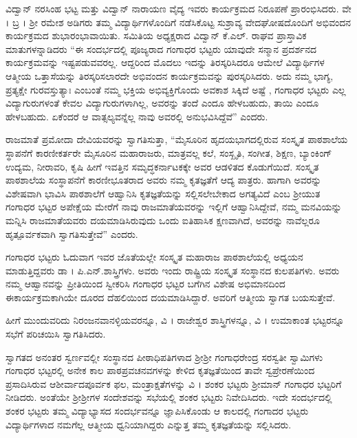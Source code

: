 {ವಿದ್ವಾನ್ ನರಸಿಂಹ ಭಟ್ಟ ಮತ್ತು ವಿದ್ವಾನ್ ನಾರಾಯಣ ವೈದ್ಯ ಇವರು ಕಾರ್ಯ\-ಕ್ರಮದ ನಿರೂಪಣೆ ಪ್ರಾರಂಭಿಸಿದರು. ವೇ । ಬ್ರ । ಶ್ರೀ ರಮೇಶ ಅಡಿಗರು ತಮ್ಮ ವಿದ್ಯಾರ್ಥಿಗಳೊಂದಿಗೆ ನಡೆಸಿಕೊಟ್ಟ ಸುಶ್ರಾವ್ಯ ವೇದಘೋಷದೊಂದಿಗೆ ಅಭಿವಂದನ ಕಾರ್ಯಕ್ರಮದ ಶುಭಾರಂಭಾವಾಯಿತು. ಸಮಿತಿಯ ಅಧ್ಯಕ್ಷರಾದ ವಿದ್ವಾನ್ ಕೆ.ಎಲ್. ರಾಘವ ಪ್ರಾಸ್ತಾವಿಕ ಮಾತುಗಳನ್ನಾಡಿದರು \enginline{-} “ಈ ಸಂದರ್ಭದಲ್ಲಿ ಪೂಜ್ಯರಾದ ಗಂಗಾಧರ ಭಟ್ಟರು ಯಾವುದೇ ಸನ್ಮಾನ ಪ್ರದರ್ಶನದ ಕಾರ್ಯಕ್ರಮವನ್ನು ಇಷ್ಟ\-ಪಡುವವರಲ್ಲ. ಆದ್ದರಿಂದ ಮೊದಲು ಇದನ್ನು ತಿರಸ್ಕರಿಸಿದರೂ ಆಮೇಲೆ ವಿದ್ಯಾರ್ಥಿಗಳ ಆತ್ಮೀಯ ಒತ್ತಾಸೆಯನ್ನು ತಿರಸ್ಕರಿಸಲಾರದೇ ಅಭಿವಂದನ ಕಾರ್ಯಕ್ರಮವನ್ನು ಪುರಸ್ಕರಿಸಿದರು. ಅದು ನಮ್ಮ ಭಾಗ್ಯ, ಪ್ರತ್ಯಕ್ಷೇ ಗುರವಸ್ತುತ್ಯಾಃ ಎಂಬಂತೆ ನಮ್ಮ ಭಕ್ತಿಯ ಅಭಿವ್ಯಕ್ತಿಗೊಂದು ಅವಕಾಶ  ಸಿಕ್ಕಿದೆ ಅಷ್ಟೆ , ಗಂಗಾಧರ ಭಟ್ಟರು ಎಲ್ಲ ವಿದ್ಯಾಗುರು\-ಗಳಂತೆ ಕೇವಲ ವಿದ್ಯಾಗುರುಗಳಾಗಿಲ್ಲ, ಅವರನ್ನು ತಂದೆ ಎಂದೂ ಹೇಳಬಹುದು, ತಾಯಿ ಎಂದೂ ಹೇಳಬಹುದು. ಏಕೆಂದರೆ ಆ ವಾತ್ಸಲ್ಯವನ್ನೆಲ್ಲ ನಾವು ಅವರಲ್ಲಿ ಅನುಭವಿ\-ಸಿದ್ದೆವೆ” ಎಂದರು. 

ರಾಜಮಾತೆ ಪ್ರಮೋದಾ ದೇವಿಯವರನ್ನು ಸ್ವಾಗತಿಸುತ್ತಾ, “ಮೈಸೂರಿನ ಹೃದಯ\-ಭಾಗದಲ್ಲಿರುವ ಸಂಸ್ಕೃತ ಪಾಠಶಾಲೆಯ ಸ್ಥಾಪನೆಗೆ ಕಾರಣೀಕರ್ತರೇ ಮೈಸೂರಿನ ಮಹಾರಾಜರು, ಮಾತ್ರವಲ್ಲ ಕಲೆ, ಸಂಸ್ಖೃತಿ, ಸಂಗೀತ, ಶಿಕ್ಷಣ, ಬ್ಯಾಂಕಿಂಗ್ ಉದ್ಯಮ, ನೀರಾವರಿ, ಕೃಷಿ ಹೀಗೆ ಇವತ್ತಿನ ಸಮೃದ್ಧಕರ್ನಾಟಕಕ್ಕೇ ಅವರ ಆಡಳಿತದ ಕೊಡುಗೆ\-ಯಿದೆ. ಸಂಸ್ಕೃತ ಪಾಠಶಾಲೆಯ ಸಂಸ್ಥಾಪನೆಗೆ ಕಾರಣೀಭೂತರಾದ ಅವರು ನಮ್ಮ ಕೃತಜ್ಞತೆಗೆ ಆದ್ಯ ಪಾತ್ರರು.  ಹಾಗಾಗಿ ಅವರನ್ನು ವಿಶೇಷವಾಗಿ ಭಾವಿಸಿ ಪಾಠಶಾಲೆಗೆ ಆಹ್ವಾನಿಸಿ ಕೃತಜ್ಞತೆಯನ್ನು ಸಲ್ಲಿಸಲೇಬೇಕಾದ ಅಗತ್ಯವಿದೆ ಎಂಬ ಶ್ರೀಯುತ ಗಂಗಾಧರ ಭಟ್ಟರ ಅಪೇಕ್ಷೆಯ ಮೇರೆಗೆ ನಾವು ರಾಜಮಾತೆಯವರನ್ನು ಇಲ್ಲಿಗೆ ಆಹ್ವಾನಿಸಿದ್ದೇವೆ, ನಮ್ಮ ಮನವಿಯನ್ನು ಮನ್ನಿಸಿ ರಾಜಮಾತೆಯವರು ದಯಮಾಡಿಸಿರುವುದು ಒಂದು ಐತಿಹಾಸಿಕ ಕ್ಷಣವಾಗಿದೆ, ಅವರನ್ನು ನಾವೆಲ್ಲರೂ ಹೃತ್ಪೂರ್ವಕವಾಗಿ ಸ್ವಾಗತಿಸುತ್ತೇವೆ” ಎಂದರು.

ಗಂಗಾಧರ ಭಟ್ಟರು ಓದುವಾಗ ಇವರ ಜೊತೆಯಲ್ಲೇ ಸಂಸ್ಕೃತ ಮಹಾರಾಜ ಪಾಠಶಾಲೆಯಲ್ಲಿ ಅಧ್ಯಯನ ಮಾಡುತ್ತಿದ್ದವರು ಡಾ । ಪಿ.ಎನ್.ಶಾಸ್ತ್ರಿಗಳು. ಅವರು ಇಂದು ರಾಷ್ಟ್ರಿಯ ಸಂಸ್ಕೃತ ಸಂಸ್ಥಾನದ ಕುಲಪತಿಗಳು. ಅವರು ನಮ್ಮ ಆಹ್ವಾನವನ್ನು ಪ್ರೀತಿಯಿಂದ ಸ್ವೀಕರಿಸಿ ಗಂಗಾಧರ ಭಟ್ಟರ ಬಗೆಗಿನ ವಿಶೇಷ ಅಭಿಮಾನದಿಂದ ಈ\break ಕಾರ್ಯಕ್ರಮಕಾಗಿಯೇ ದೂರದ ದೆಹಲಿಯಿಂದ ದಯಮಾಡಿಸಿದ್ದಾರೆ. ಅವರಿಗೆ ಆತ್ಮೀಯ ಸ್ವಾಗತ ಬಯಸುತ್ತೇವೆ.

ಹೀಗೆ ಮುಂದುವರಿದು ನಿರಂಜನವಾನಳ್ಳಿಯವರನ್ನೂ, ವಿ । ರಾಜೇಶ್ವರ ಶಾಸ್ತ್ರಿ\-ಗಳನ್ನೂ, ವಿ । ಉಮಾಕಾಂತ ಭಟ್ಟರನ್ನೂ ಸಭೆಗೆ ಪರಿಚಯಿಸಿ ಸ್ವಾಗತಿಸಿದರು.

ಸ್ವಾಗತದ  ಅನಂತರ ಸ್ವರ್ಣವಲ್ಲೀ ಸಂಸ್ಥಾನದ ಪೀಠಾಧಿಪತಿಗಳಾದ ಶ್ರೀಶ್ರೀ ಗಂಗಾಧರೇಂದ್ರ ಸರಸ್ವತೀ ಸ್ವಾಮಿಗಳು  ಗಂಗಾಧರ ಭಟ್ಟರಲ್ಲಿ ಅನೇಕ ಕಾಲ ಪಾಠ\-ಪ್ರವಚನವಗಳನ್ನು ಕೇಳಿದ ಕೃತಜ್ಞತೆಯಿಂದ ತಾವೇ ಸ್ವಪ್ರೇರಣೆಯಿಂದ ಪ್ರಸಾದಿಸಿರುವ ಆಶೀರ್ವಾದಪೂರ್ವಕ ಫಲ, ಮಂತ್ರಾಕ್ಷತೆಗಳನ್ನು ವಿ । ಶಂಕರ ಭಟ್ಟರು ಶ್ರೀಮಾನ್ ಗಂಗಾಧರ ಭಟ್ಟರಿಗೆ ನೀಡಿದರು. ಅಂತೆಯೇ ಶ್ರೀಶ್ರೀಗಳ ಸಂದೇಶವನ್ನು ಸಭೆಯಲ್ಲಿ ಶಂಕರ ಭಟ್ಟರು ನಿವೇದಿಸಿದರು. ಇದೇ ಸಂದರ್ಭದಲ್ಲಿ ಶಂಕರ ಭಟ್ಟರು ತಮ್ಮ ವಿದ್ಯಾಭ್ಯಾಸದ ಸಂದರ್ಭವನ್ನೂ ಜ್ಞಾಪಿಸಿಕೊಂಡು ಆ ಕಾಲದಲ್ಲಿ ಗಂಗಾದರ ಭಟ್ಟರು ವಿದ್ಯಾರ್ಥಿಗಳಾದ ನಮಗೆಲ್ಲ ಆತ್ಮೀಯ ಧ್ವನಿಯಾಗಿದ್ದರು ಎನ್ನುತ್ತ ತಮ್ಮ ಕೃತಜ್ಞತೆಯನ್ನು ಸಲ್ಲಿಸಿದರು.

}
